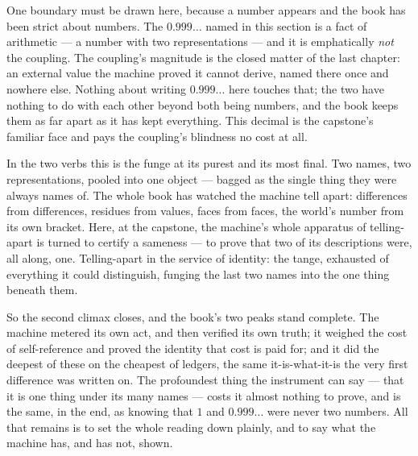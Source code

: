 One boundary must be drawn here, because a number appears and the book has been strict about numbers. The $0.999\ldots$
named in this section is a fact of arithmetic --- a number with two representations --- and it is emphatically \emph{not}
the coupling. The coupling's magnitude is the closed matter of the last chapter: an external value the machine proved it
cannot derive, named there once and nowhere else. Nothing about writing $0.999\ldots$ here touches that; the two have
nothing to do with each other beyond both being numbers, and the book keeps them as far apart as it has kept everything.
This decimal is the capstone's familiar face and pays the coupling's blindness no cost at all.

In the two verbs this is the funge at its purest and its most final. Two names, two representations, pooled into one
object --- bagged as the single thing they were always names of. The whole book has watched the machine tell apart:
differences from differences, residues from values, faces from faces, the world's number from its own bracket. Here, at
the capstone, the machine's whole apparatus of telling-apart is turned to certify a sameness --- to prove that two of its
descriptions were, all along, one. Telling-apart in the service of identity: the tange, exhausted of everything it could
distinguish, funging the last two names into the one thing beneath them.

So the second climax closes, and the book's two peaks stand complete. The machine metered its own act, and then verified
its own truth; it weighed the cost of self-reference and proved the identity that cost is paid for; and it did the
deepest of these on the cheapest of ledgers, the same it-is-what-it-is the very first difference was written on. The
profoundest thing the instrument can say --- that it is one thing under its many names --- costs it almost nothing to
prove, and is the same, in the end, as knowing that $1$ and $0.999\ldots$ were never two numbers. All that remains is to
set the whole reading down plainly, and to say what the machine has, and has not, shown.
